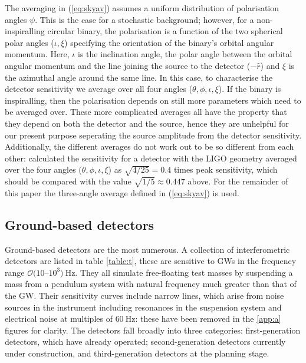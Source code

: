 The averaging in (\ref{eq:skyav}) assumes a uniform distribution of polarisation angles $\psi$. This is the case for a stochastic background; however, for a non-inspiralling circular binary, the polarisation is a function of the two spherical polar angles ($\iota,\xi$) specifying the orientation of the binary's orbital angular momentum. Here, $\iota$ is the inclination angle, the polar angle between the orbital angular momentum and the line joining the source to the detector ($-\hat{r}$) and $\xi$ is the azimuthal angle around the same line. In this case, to characterise the detector sensitivity we average over all four angles ($\theta,\phi,\iota,\xi$). If the binary is inspiralling, then the polarisation depends on still more parameters which need to be averaged over. These more complicated averages all have the property that they depend on both the detector and the source, hence they are unhelpful for our present purpose seperating the source amplitude from the detector sensitivity. Additionally, the different averages do not work out to be so different from each other: \citet{1993PhRvD..47.2198F} calculated the sensitivity for a detector with the LIGO geometry averaged over the four angles ($\theta,\phi,\iota,\xi$) as $\sqrt{4/25}=0.4$ times peak sensitivity, which should be compared with the value $\sqrt{1/5}\approx 0.447$ above. For the remainder of this paper the three-angle average defined in (\ref{eq:skyav}) is used.

\subsection{Ground-based detectors}\label{sec:ground}

Ground-based detectors are the most numerous. A collection of interferometric detectors are listed in table \ref{table:t}, these are sensitive to GWs in the frequency range ${\mathcal{O}}(10$--$10^{3})~\mathrm{Hz}$. They all simulate free-floating test masses by suspending a mass from a pendulum system with natural frequency much greater than that of the GW. Their sensitivity curves include narrow lines, which arise from noise sources in the instrument including resonances in the suspension system and electrical noise at multiples of $60~\mathrm{Hz}$: these have been removed in the \ref{app:a} figures for clarity. The detectors fall broadly into three categories: first-generation detectors, which have already operated; second-generation detectors currently under construction, and third-generation detectors at the planning stage. 

